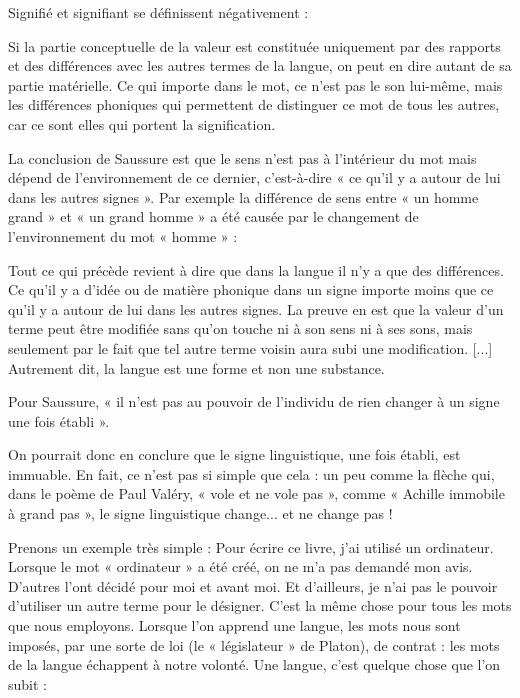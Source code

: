 Signifié et signifiant se définissent négativement :
\begin{lecture}{}
Si la partie conceptuelle de la valeur est constituée uniquement par des rapports et des différences avec les autres termes de la langue, on peut en dire autant de sa partie matérielle. Ce qui importe dans le mot, ce n’est pas le son lui-même, mais les différences phoniques qui permettent de distinguer ce mot de tous les autres, car ce sont elles qui portent la signification.
\end{lecture}
La conclusion de Saussure est que le sens n’est pas à l’intérieur du mot mais dépend de l’environnement de ce dernier, c’est-à-dire « ce qu’il y a autour de lui dans les autres signes ». Par exemple la différence de sens entre « un homme grand » et « un grand homme » a été causée par le changement de l’environnement du mot « homme » :
\begin{lecture}{}
Tout ce qui précède revient à dire que dans la langue il n’y a que des différences. Ce qu’il y a d’idée ou de matière phonique dans un signe importe moins que ce qu’il y a autour de lui dans les autres signes. La preuve en est que la valeur d’un terme peut être modifiée sans qu’on touche ni à son sens ni à ses sons, mais seulement par le fait que tel autre terme voisin aura subi une modification. [...] Autrement dit, la langue est une forme et non une substance.
\end{lecture}

Pour Saussure, « il n’est pas au pouvoir de l’individu de rien changer à un signe une fois établi ».

On pourrait donc en conclure que le signe linguistique, une fois établi, est immuable. En fait, ce n’est pas si simple que cela : un peu comme la flèche qui, dans le poème de Paul Valéry, « vole et ne vole pas », comme « Achille immobile à grand pas », le signe linguistique change... et ne change pas !

Prenons un exemple très simple : Pour écrire ce livre, j’ai utilisé un ordinateur. Lorsque le mot « ordinateur » a été créé, on ne m’a pas demandé mon avis. D’autres l’ont décidé pour moi et avant moi. Et d’ailleurs, je n’ai pas le pouvoir d’utiliser un autre terme pour le désigner. C’est la même chose pour tous les mots que nous employons. Lorsque l’on apprend une langue, les mots nous sont imposés, par une sorte de loi (le « législateur » de Platon), de contrat : les mots de la langue échappent à notre volonté. Une langue, c’est quelque chose que l’on subit :

